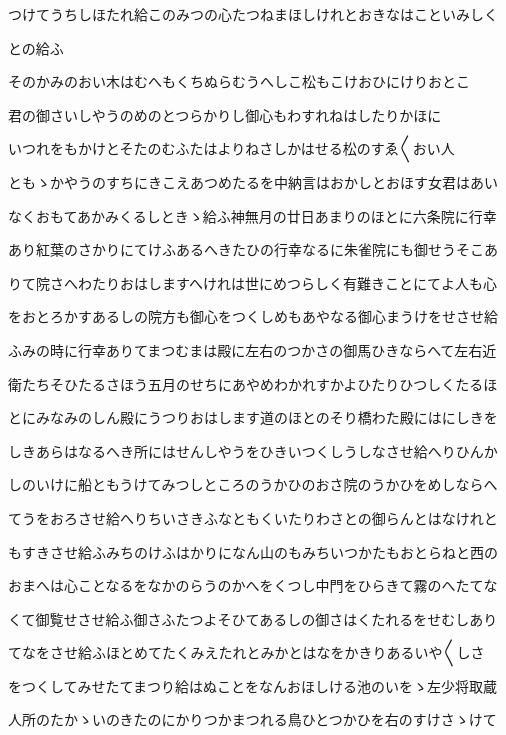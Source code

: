 \documentclass[a4paper,11pt,landscape]{ltjtarticle}
\begin{document}
\par\medskip
つけてうちしほたれ給このみつの心たつねまほしけれとおきなはこといみしく
\par\medskip
との給ふ
\par\medskip
そのかみのおい木はむへもくちぬらむうへしこ松もこけおひにけりおとこ
\par\medskip
君の御さいしやうのめのとつらかりし御心もわすれねはしたりかほに
\par\medskip
いつれをもかけとそたのむふたはよりねさしかはせる松のすゑ〱おい人
\par\medskip
ともゝかやうのすちにきこえあつめたるを中納言はおかしとおほす女君はあい
\par\medskip
なくおもてあかみくるしときゝ給ふ神無月の廿日あまりのほとに六条院に行幸
\par\medskip
あり紅葉のさかりにてけふあるへきたひの行幸なるに朱雀院にも御せうそこあ
\par\medskip
りて院さへわたりおはしますへけれは世にめつらしく有難きことにてよ人も心
\par\medskip
をおとろかすあるしの院方も御心をつくしめもあやなる御心まうけをせさせ給
\par\medskip
ふみの時に行幸ありてまつむまは殿に左右のつかさの御馬ひきならへて左右近
\par\medskip
衛たちそひたるさほう五月のせちにあやめわかれすかよひたりひつしくたるほ
\par\medskip
とにみなみのしん殿にうつりおはします道のほとのそり橋わた殿にはにしきを
\par\medskip
しきあらはなるへき所にはせんしやうをひきいつくしうしなさせ給へりひんか
\par\medskip
しのいけに船ともうけてみつしところのうかひのおさ院のうかひをめしならへ
\par\medskip
てうをおろさせ給へりちいさきふなともくいたりわさとの御らんとはなけれと
\par\medskip
もすきさせ給ふみちのけふはかりになん山のもみちいつかたもおとらねと西の
\par\medskip
おまへは心ことなるをなかのらうのかへをくつし中門をひらきて霧のへたてな
\par\medskip
くて御覧せさせ給ふ御さふたつよそひてあるしの御さはくたれるをせむしあり
\par\medskip
てなをさせ給ふほとめてたくみえたれとみかとはなをかきりあるいや〱しさ
\par\medskip
をつくしてみせたてまつり給はぬことをなんおほしける池のいをゝ左少将取蔵
\par\medskip
人所のたかゝいのきたのにかりつかまつれる鳥ひとつかひを右のすけさゝけて
\end{document}
